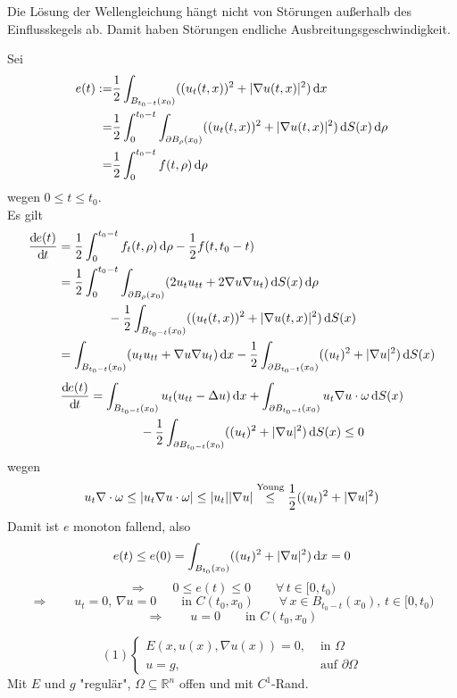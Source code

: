 \begin{bemerkung}
	Die Lösung der Wellengleichung hängt nicht von Störungen außerhalb des Einflusskegels ab. Damit haben Störungen endliche Ausbreitungsgeschwindigkeit.
\end{bemerkung}
\begin{beweis}
	Sei
	\begin{align*}
		e(t) :=& \frac{1}{2} \int_{B_{t_0-t}(x_0)}^{} ((u_t(t,x))^2 + \lvert \nabla  u(t,x)\rvert^2) \,\mathrm{d}x \\
		=& \frac{1}{2} \int_{0}^{t_0-t} \int_{\partial B_{\rho}(x_0)}^{} ((u_t(t,x))^2 + \lvert \nabla u(t,x)\rvert^2) \,\mathrm{d}S(x) \,\mathrm{d} \rho \\
		=& \frac{1}{2} \int_{0}^{t_0-t} f(t,\rho) \,\mathrm{d}\rho
	\end{align*}
	wegen $0 \leq t \leq t_0$. \\
	Es gilt
	\begin{align*}
		\frac{\mathrm{d}\mkern-1.0mu e(t)}{\mathrm{d}\mkern-1.0mu t}  &= \frac{1}{2} \int_{0}^{t_0-t} f_t(t,\rho)  \,\mathrm{d}\rho - \frac{1}{2}f(t,t_0-t) \\
		&= \frac{1}{2} \int_{0}^{t_0-t} \int_{\partial B_\rho(x_0)}^{} ( 2 u_t u_{tt} + 2  \nabla u  \nabla u_t) \,\mathrm{d}S(x) \,\mathrm{d}\rho \\
		& \qquad \qquad - \frac{1}{2}\int_{B_{t_0-t}(x_0)}^{}((u_t(t,x))^2 + \lvert \nabla u(t,x)\rvert^2) \,\mathrm{d}S(x) \\
		&= \int_{B_{t_0-t}(x_0)}^{}(u_t u_{tt}+  \nabla u  \nabla u_t) \,\mathrm{d}x - \frac{1}{2} \int_{\partial B_{t_0-t}(x_0)}^{} 
		((u_t)^2 + \lvert \nabla u\rvert^2) \,\mathrm{d}S(x)
	\end{align*}
	\begin{align*}
		\frac{\mathrm{d}\mkern-1.0mu e(t)}{\mathrm{d}\mkern-1.0mu t}  &= \int_{B_{t_0-t}(x_0)}^{} u_t( u_{tt}- \Delta u) \,\mathrm{d}x + \int_{\partial B_{t_0-t}(x_0)}^{} u_t  \nabla u \cdot \omega
		 \,\mathrm{d}S(x) \\ & \qquad \qquad - \frac{1}{2} \int_{\partial B_{t_0-t}(x_0)}^{}((u_t)^2 + \lvert  \nabla u\rvert^2) \,\mathrm{d}S(x) \leq 0
	\end{align*}
	wegen
	\[
		u_t  \nabla \cdot \omega \leq \lvert u_t  \nabla u \cdot \omega\rvert \leq \lvert u_t\rvert\lvert \nabla u\rvert \stackrel{\text{Young}}{\leq } \frac{1}{2} ((u_t)^2 + \lvert \nabla u\rvert^2)
	\]
	Damit ist $e$ monoton fallend, also 
	\[
		e(t) \leq e(0) = \int_{B_{t_0}(x_0)}^{} ((u_t)^2 + \lvert \nabla u\rvert^2) \,\mathrm{d}x =0
	\]
	\[
		\Rightarrow \qquad 0 \leq  e(t) \leq 0 \qquad \forall\, t \in [0,t_0)
	\]
	\[
		\Rightarrow \qquad u_t=0, \, \nabla u=0 \qquad \text{in } C(t_0,x_0) \qquad \forall\, x \in B_{t_0-t}(x_0), \,t \in [0,t_0)
	\]
	\[
		\Rightarrow \qquad u=0 \qquad \text{in }C(t_0,x_0)
	\]
\end{beweis}
\[
	(1) \begin{cases}
		E(x,u(x), \nabla u(x))=0, &\text{ in }\Omega\\
		u=g,&\text{ auf }\partial \Omega
	\end{cases}
\]
Mit $E$ und $g$ "regulär", $\Omega \subseteq \mathbb{R}^n$ offen und mit $C^1$-Rand.

